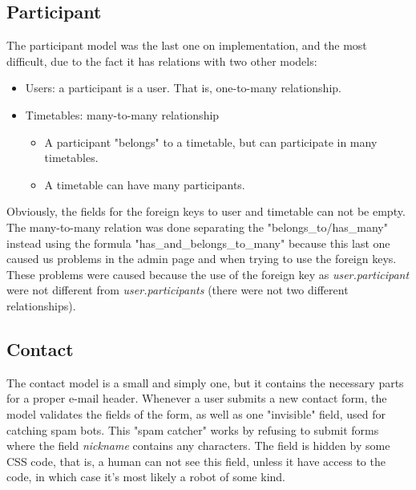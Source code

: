 \subsection{Participant}
\vspace{-5mm}
The participant model was the last one on implementation, and the most difficult, due to the fact it has relations with two other models:
\begin{itemize} \setlength{\itemsep}{-5pt}
\item Users: a participant is a user. That is, one-to-many relationship.
\item Timetables: many-to-many relationship
\begin{itemize} \setlength{\itemsep}{-5pt}
\item A participant "belongs" to a timetable, but can participate in many timetables.
\item A timetable can have many participants.
\end{itemize}
\end{itemize} 
Obviously, the fields for the foreign keys to user and timetable can not be empty.\\
The many-to-many relation was done separating the "belongs\_to/has\_many" instead using the formula "has\_and\_belongs\_to\_many" because this last one caused us problems in the admin page and when trying to use the foreign keys. These problems were caused  because the use of the foreign key as \textit{user.participant} were not different from \textit{user.participants} (there were not two different relationships).
\subsection{Contact}
\vspace{-5mm}
The contact model is a small and simply one, but it contains the necessary parts for a proper e-mail header. 
Whenever a user submits a new contact form, the model validates the fields of the form, as well as one "invisible" field, 
used for catching spam bots. This "spam catcher" works by refusing to submit forms where the field \textit{nickname} 
contains any characters. The field is hidden by some CSS code, that is, a human can not see this field, unless it have access to the code, in which case it's most likely a robot of some kind.
 
